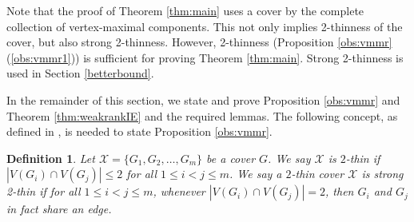 \documentclass[10pt]{article}
\def\X{\mathcal {X}}
\newtheorem{dfn}{Definition}
\begin{document}
\medskip\noindent
Note that the proof of Theorem \ref{thm:main} uses a cover by the complete collection of vertex-maximal components. This not only implies 2-thinness of the cover, but also strong 2-thinness. However, 2-thinness (Proposition \ref{obs:vmmr}(\ref{obs:vmmr1})) is sufficient for proving Theorem \ref{thm:main}. Strong 2-thinness is used in Section \ref{betterbound}.




In the remainder of this section, we state and prove Proposition \ref{obs:vmmr} and Theorem \ref{thm:weakrankIE} and the required lemmas. The following concept, as defined in \cite{JacksonJordanrank:2006}, is needed to state Proposition \ref{obs:vmmr}.

\begin{dfn}\label{dfn:2thin}
Let $\X =\{G_1, G_2, \ldots, G_m\}$ be a cover $G$. We say $\X$ is {\em $2$-thin} if $| V(G_i) \cap V(G_j)| \leq 2$ for all $1 \leq i < j \leq m$.  We say a $2$-thin cover $\X$ is {\em strong 2-thin} if for all $1 \leq i < j \leq m$, whenever $|V(G_i) \cap V(G_j)|=2$, then $G_i$ and $G_j$ in fact share an edge.
\end{dfn}
\end{document}
